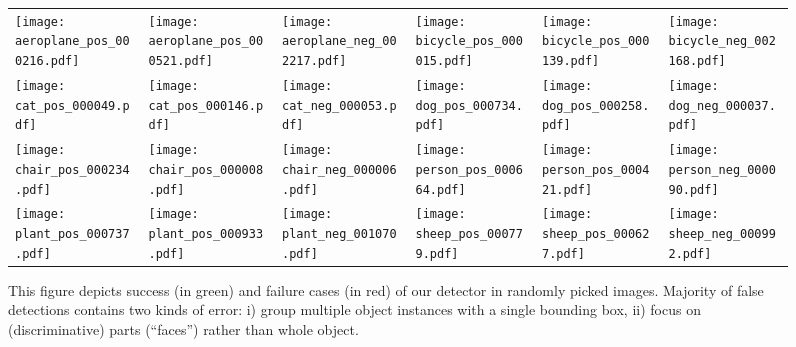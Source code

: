 \documentclass[10pt,twocolumn,letterpaper]{article}
\begin{document}
\begin{figure*}[t!]
\begin{tabular}{*{6}{C{0.13\textwidth}}}
  \texttt{[image: aeroplane\_pos\_000216.pdf]}&
  \texttt{[image: aeroplane\_pos\_000521.pdf]}&
  \texttt{[image: aeroplane\_neg\_002217.pdf]}&
  \texttt{[image: bicycle\_pos\_000015.pdf]}&
  \texttt{[image: bicycle\_pos\_000139.pdf]}&
  \texttt{[image: bicycle\_neg\_002168.pdf]}\\[-2ex]

  \texttt{[image: cat\_pos\_000049.pdf]}&
  \texttt{[image: cat\_pos\_000146.pdf]}&
  \texttt{[image: cat\_neg\_000053.pdf]}&
  \texttt{[image: dog\_pos\_000734.pdf]}&
  \texttt{[image: dog\_pos\_000258.pdf]}&
  \texttt{[image: dog\_neg\_000037.pdf]}\\[-2ex]
  
  \texttt{[image: chair\_pos\_000234.pdf]}&
  \texttt{[image: chair\_pos\_000008.pdf]}&
  \texttt{[image: chair\_neg\_000006.pdf]}&
  \texttt{[image: person\_pos\_000664.pdf]}&
  \texttt{[image: person\_pos\_000421.pdf]}&
  \texttt{[image: person\_neg\_000090.pdf]}\\[-2ex]
  
  \texttt{[image: plant\_pos\_000737.pdf]}&
  \texttt{[image: plant\_pos\_000933.pdf]}&
  \texttt{[image: plant\_neg\_001070.pdf]}&
  \texttt{[image: sheep\_pos\_000779.pdf]}&
  \texttt{[image: sheep\_pos\_000627.pdf]}&
  \texttt{[image: sheep\_neg\_000992.pdf]}
  \end{tabular}
\caption{This figure depicts success (in green) and failure cases (in red) of our detector in randomly picked images. Majority of false detections contains two kinds of error: i) group multiple object instances with a single bounding box, ii) focus on (discriminative) parts (\eg ``faces'') rather than whole object. }
\label{fig:detexamples}
\end{figure*}%
\end{document}
